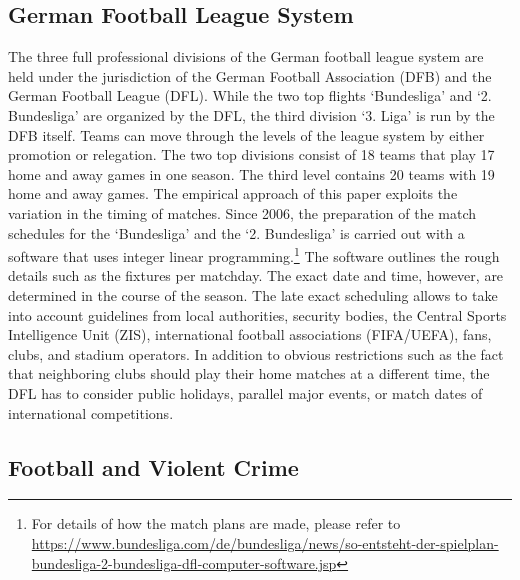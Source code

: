 \subsection{German Football League System}
The three full professional divisions of the German football league system are held under the jurisdiction of the German Football Association (DFB) and the German Football League (DFL). While the two top flights `Bundesliga' and `2. Bundesliga' are organized by the DFL, the third division `3. Liga' is run by the DFB itself. Teams can move through the levels of the league system by either promotion or relegation. The two top divisions consist of 18 teams that play 17 home and away games in one season. The third level contains 20 teams with 19 home and away games. The empirical approach of this paper exploits the variation in the timing of matches. Since 2006, the preparation of the match schedules for the `Bundesliga' and the `2. Bundesliga' is carried out with a software that uses integer linear programming.\footnote{For details of how the match plans are made, please refer to \href{https://www.bundesliga.com/de/bundesliga/news/so-entsteht-der-spielplan-bundesliga-2-bundesliga-dfl-computer-software.jsp}{https://www.bundesliga.com/de/bundesliga/news/so-entsteht-der-spielplan-bundesliga-2-bundesliga-dfl-computer-software.jsp}} The software outlines the rough details such as the fixtures per matchday. The exact date and time, however, are determined in the course of the season. The late exact scheduling allows to take into account guidelines from local authorities, security bodies, the Central Sports Intelligence Unit (ZIS), international football associations (FIFA/UEFA), fans, clubs, and stadium operators. In addition to obvious restrictions such as the fact that neighboring clubs should play their home matches at a different time, the DFL has to consider public holidays, parallel major events, or match dates of international competitions.



\subsection{Football and Violent Crime}

